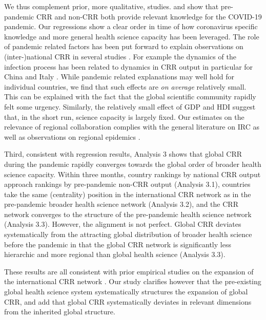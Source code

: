 We thus complement prior, more qualitative, studies. \citet{haghani2020covid} and \citet{zhang2020scientific} show that pre-pandemic CRR and non-CRR both provide relevant knowledge for the COVID-19 pandemic. Our regressions show a clear order in time of how coronavirus specific knowledge and more general health science capacity has been leveraged. The role of pandemic related factors has been put forward to explain observations on (inter-)national CRR in several studies \citep{haghani2020covid,fry2020consolidation,zhang2020scientific}. For example the dynamics of the infection process has been related to dynamics in CRR output in particular for China and Italy \citep[e.g.][]{fry2020consolidation}. While pandemic related explanations may well hold for individual countries, we find that such effects are \textit{on average} relatively small. This can be explained with the fact that the global scientific community rapidly felt some urgency. Similarly, the relatively small effect of GDP and HDI suggest that, in the short run, science capacity is largely fixed. Our estimates on the relevance of regional collaboration complies with the general literature on IRC \citep{frenken2009spatial} as well as observations on regional epidemics \citep{haghani2020covid,zhang2020scientific}. %
 
Third, consistent with regression results, Analysis 3 shows that global CRR during the pandemic rapidly converges towards the global order of broader health science capacity. Within three months, country rankings by national CRR output approach rankings by pre-pandemic non-CRR output (Analysis 3.1), countries take the same (centrality) position in the international CRR network as in the pre-pandemic broader health science network (Analysis 3.2), and the CRR network converges to the structure of the pre-pandemic health science network (Analysis 3.3).  %
However, the alignment is not perfect. Global CRR deviates systematically from the attracting global distribution of broader health science before the pandemic in that the global CRR network is significantly less hierarchic and more regional than global health science (Analysis 3.3).  

These results are all consistent with prior empirical studies on the expansion of the international CRR network \citep{cai2021international,fry2020consolidation,haghani2020covid,zhang2020scientific}. Our study clarifies however that the pre-existing global health science system systematically structures the expansion of global CRR, and add that global CRR systematically deviates in relevant dimensions from the inherited global structure.


